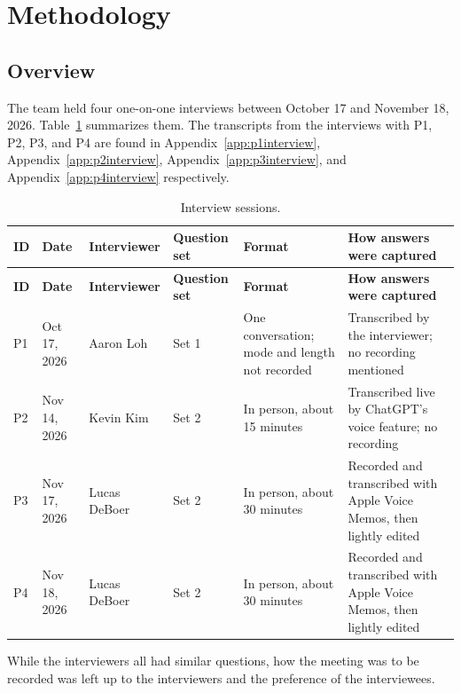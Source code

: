 \documentclass[12pt, titlepage]{article}
\begin{document}
\section{Methodology}\label{sec:method}

\subsection{Overview}

The team held four one-on-one interviews between October 17 and November 18, 2026. Table~\ref{tab:sessions} summarizes them. 
The transcripts from the interviews with P1, P2, P3, and P4 are found in Appendix~\ref{app:p1interview}, Appendix~\ref{app:p2interview},
Appendix~\ref{app:p3interview}, and Appendix~\ref{app:p4interview} respectively.
{\small
\setlength{\tabcolsep}{4pt}
\begin{longtable}{>{\raggedright\arraybackslash}p{0.8cm} >{\raggedright\arraybackslash}p{2.2cm} >{\raggedright\arraybackslash}p{2.3cm} >{\raggedright\arraybackslash}p{1.8cm} >{\raggedright\arraybackslash}p{3.2cm} >{\raggedright\arraybackslash}p{4.2cm}}
\caption{Interview sessions.}\label{tab:sessions}\\
\toprule
\textbf{ID} & \textbf{Date} & \textbf{Interviewer} & \textbf{Question set} & \textbf{Format} & \textbf{How answers were captured}\\
\midrule
\endfirsthead
\toprule
\textbf{ID} & \textbf{Date} & \textbf{Interviewer} & \textbf{Question set} & \textbf{Format} & \textbf{How answers were captured}\\
\midrule
\endhead
\bottomrule
\endfoot
P1 & Oct 17, 2026 & Aaron Loh & Set 1 & One conversation; mode and length not recorded & Transcribed by the interviewer; no recording mentioned\\\addlinespace[3pt]
P2 & Nov 14, 2026 & Kevin Kim & Set 2 & In person, about 15 minutes & Transcribed live by ChatGPT's voice feature; no recording\\\addlinespace[3pt]
P3 & Nov 17, 2026 & Lucas DeBoer & Set 2 & In person, about 30 minutes & Recorded and transcribed with Apple Voice Memos, then lightly edited\\\addlinespace[3pt]
P4 & Nov 18, 2026 & Lucas DeBoer & Set 2 & In person, about 30 minutes & Recorded and transcribed with Apple Voice Memos, then lightly edited\\
\end{longtable}
}
While the interviewers all had similar questions, how the meeting was to be recorded was left up to the interviewers and the preference of the interviewees.
\end{document}
